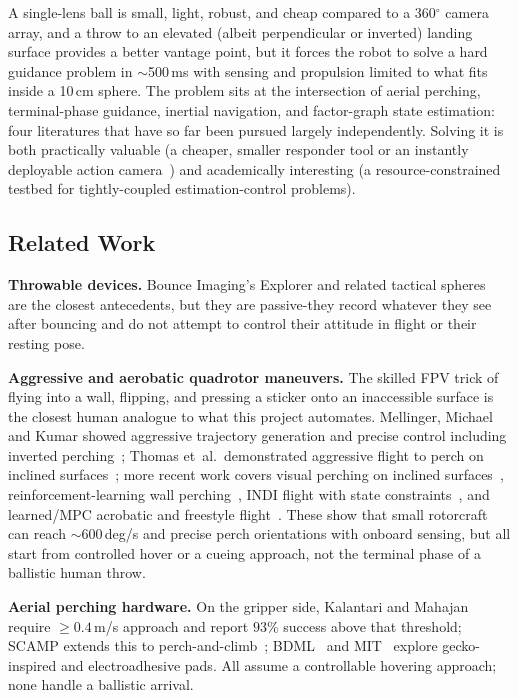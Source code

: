 \documentclass[11pt]{article}
\begin{document}
A single-lens ball is small, light, robust, and cheap compared to a
360$^{\circ}$ camera array, and a throw to an elevated (albeit perpendicular or inverted) landing surface
provides a better vantage point, but it forces the robot to solve a hard guidance
problem in $\sim$500\,ms with sensing and propulsion limited to what fits inside a 10\,cm
sphere. The problem sits at the intersection of aerial perching,
terminal-phase guidance, inertial navigation, and factor-graph state
estimation: four literatures that have so far been pursued largely
independently. Solving it is both practically valuable (a cheaper, smaller
responder tool or an instantly deployable action camera~\cite{dhs_throwable}) and academically interesting (a
resource-constrained testbed for tightly-coupled estimation-control problems).

\subsection{Related Work}
\label{sec:related}

\textbf{Throwable devices.} Bounce Imaging's Explorer and related tactical
spheres~\cite{bounce_mit,bounce_newatlas} are the closest antecedents, but
they are passive-they record whatever they see after bouncing and do not
attempt to control their attitude in flight or their resting pose.

\textbf{Aggressive and aerobatic quadrotor maneuvers.} The skilled FPV
trick of flying into a wall, flipping, and pressing a sticker onto an
inaccessible surface is the closest human analogue to what this project
automates. Mellinger, Michael and Kumar showed aggressive trajectory
generation and precise control including inverted
perching~\cite{mellinger2012}; Thomas et~al.\ demonstrated aggressive
flight to perch on inclined surfaces~\cite{thomas2016inclined}; more recent
work covers visual perching on inclined
surfaces~\cite{paneque2021visual}, reinforcement-learning wall
perching~\cite{xie2021rl}, INDI flight with state
constraints~\cite{indi2022}, and learned/MPC acrobatic and freestyle
flight~\cite{kaufmann2020deepdrone,romero2024mpc,scirob2024freestyle}. These
show that small rotorcraft can reach $\sim$600\,deg/s and precise perch
orientations with onboard sensing, but all start from controlled hover or
a cueing approach, not the terminal phase of a ballistic human throw.

\textbf{Aerial perching hardware.} On the gripper side, Kalantari and
Mahajan~\cite{kalantari2015} require $\geq 0.4$\,m/s approach and report
$93\%$ success above that threshold; SCAMP extends this to
perch-and-climb~\cite{pope2017scamp}; BDML~\cite{estrada2014} and
MIT~\cite{electroadhesive2026} explore gecko-inspired and electroadhesive
pads. All assume a controllable hovering approach; none handle a ballistic
arrival.
\end{document}
